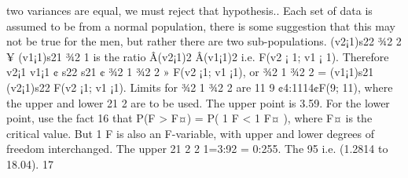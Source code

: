 two variances are equal, we must reject that hypothesis.. Each set of data is
assumed to be from a normal population, there is some suggestion that this
may not be true for the men, but rather there are two sub-populations.
(v2¡1)s22 ¾2
2
¥ (v1¡1)s21
¾2
1
is the ratio Â(v2¡1)2
Â(v1¡1)2
i.e. F(v2 ¡ 1; v1 ¡ 1). Therefore
v2¡1
v1¡1 ¢ s22
s21
¢ ¾2
1
¾2
2
» F(v2 ¡1; v1 ¡1), or ¾2
1
¾2
2
= (v1¡1)s21
(v2¡1)s22
F(v2 ¡1; v1 ¡1). Limits for
¾2
1
¾2
2
are 11
9 ¢4:1114¢F(9; 11), where the upper and lower 21
2%
are to be used. The upper point is 3.59. For the lower point, use the fact
16
that P(F > F¤) = P( 1
F < 1
F¤ ), where F¤ is the critical value. But 1
F is also
an F-variable, with upper and lower degrees of freedom interchanged. The
upper 21
2%
2%
1=3:92 = 0:255. The 95%
i.e. (1.2814 to 18.04).
17
